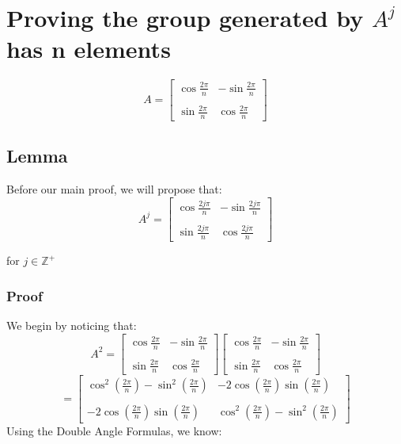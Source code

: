 \documentclass[12pt]{article}
\begin{document}
\section*{Proving the group generated by $A^j$ has n elements}

\[
	A = 
	\begin{bmatrix}
		\cos\frac{2\pi}{n} & -\sin\frac{2\pi}{n} \\
		\\
		\sin\frac{2\pi}{n} &  \cos\frac{2\pi}{n}
	\end{bmatrix}
\]
\subsection*{Lemma}

Before our main proof, we will propose that: \\

\[
	A^j = 
	\begin{bmatrix}
		\cos\frac{2j\pi}{n} & -\sin\frac{2j\pi}{n} \\
		\\
		\sin\frac{2j\pi}{n} &  \cos\frac{2j\pi}{n}
	\end{bmatrix}
\]

for $j\in\mathbb{Z}^{+}$
\\

\subsubsection*{Proof}

We begin by noticing that: \\
\[
	A^2 = 
	\begin{bmatrix}
		\cos\frac{2\pi}{n} & -\sin\frac{2\pi}{n} \\
		\\
		\sin\frac{2\pi}{n} &  \cos\frac{2\pi}{n}
	\end{bmatrix}
	\begin{bmatrix}
		\cos\frac{2\pi}{n} & -\sin\frac{2\pi}{n} \\
		\\
		\sin\frac{2\pi}{n} &  \cos\frac{2\pi}{n}
	\end{bmatrix}
\]
\[
	=
	\begin{bmatrix}
		\cos^2(\frac{2\pi}{n}) - \sin^2(\frac{2\pi}{n}) & -2\cos (\frac{2\pi}{n})\sin (\frac{2\pi}{n}) \\
		\\
		-2\cos (\frac{2\pi}{n}) \sin (\frac{2\pi}{n}) & \cos^2(\frac{2\pi}{n}) - \sin^2(\frac{2\pi}{n})  
	\end{bmatrix}
\]
Using the Double Angle Formulas, we know:
\end{document}
